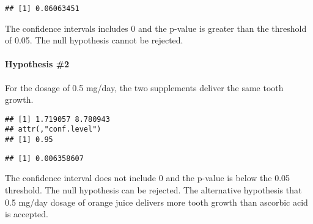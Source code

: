 \documentclass[
]{article}
\newenvironment{Shaded}{\begin{snugshade}}{\end{snugshade}}
\newcommand{\AttributeTok}[1]{\textcolor[rgb]{0.77,0.63,0.00}{#1}}
\newcommand{\FloatTok}[1]{\textcolor[rgb]{0.00,0.00,0.81}{#1}}
\newcommand{\FunctionTok}[1]{\textcolor[rgb]{0.00,0.00,0.00}{#1}}
\newcommand{\NormalTok}[1]{#1}
\newcommand{\OtherTok}[1]{\textcolor[rgb]{0.56,0.35,0.01}{#1}}
\newcommand{\SpecialCharTok}[1]{\textcolor[rgb]{0.00,0.00,0.00}{#1}}
\begin{document}
\begin{Shaded}
\end{Shaded}

\begin{verbatim}
## [1] 0.06063451
\end{verbatim}

The confidence intervals includes 0 and the p-value is greater than the
threshold of 0.05. The null hypothesis cannot be rejected.

\hypertarget{hypothesis-2}{%
\paragraph{Hypothesis \#2}\label{hypothesis-2}}

For the dosage of 0.5 mg/day, the two supplements deliver the same tooth
growth.

\begin{Shaded}
\end{Shaded}

\begin{verbatim}
## [1] 1.719057 8.780943
## attr(,"conf.level")
## [1] 0.95
\end{verbatim}

\begin{Shaded}
\end{Shaded}

\begin{verbatim}
## [1] 0.006358607
\end{verbatim}

The confidence interval does not include 0 and the p-value is below the
0.05 threshold. The null hypothesis can be rejected. The alternative
hypothesis that 0.5 mg/day dosage of orange juice delivers more tooth
growth than ascorbic acid is accepted.
\end{document}
